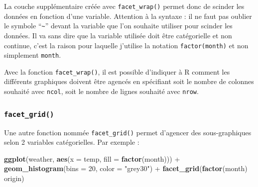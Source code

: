 \documentclass[
  a4paper,
]{article}
\newenvironment{Shaded}{\begin{snugshade}}{\end{snugshade}}
\newcommand{\DataTypeTok}[1]{\textcolor[rgb]{0.00,0.34,0.68}{#1}}
\newcommand{\DecValTok}[1]{\textcolor[rgb]{0.69,0.50,0.00}{#1}}
\newcommand{\KeywordTok}[1]{\textcolor[rgb]{0.12,0.11,0.11}{\textbf{#1}}}
\newcommand{\NormalTok}[1]{\textcolor[rgb]{0.12,0.11,0.11}{#1}}
\newcommand{\OperatorTok}[1]{\textcolor[rgb]{0.12,0.11,0.11}{#1}}
\newcommand{\StringTok}[1]{\textcolor[rgb]{0.75,0.01,0.01}{#1}}
\begin{document}
La couche supplémentaire créée avec \texttt{facet\_wrap()} permet donc de scinder les données en fonction d'une variable. Attention à la syntaxe : il ne faut pas oublier le symbole ``\texttt{\textasciitilde{}}'' devant la variable que l'on souhaite utiliser pour scinder les données. Il va sans dire que la variable utilisée doit être catégorielle et non continue, c'est la raison pour laquelle j'utilise la notation \texttt{factor(month)} et non simplement \texttt{month}.

Avec la fonction \texttt{facet\_wrap()}, il est possible d'indiquer à R comment les différents graphiques doivent être agencés en spécifiant soit le nombre de colonnes souhaité avec \texttt{ncol}, soit le nombre de lignes souhaité avec \texttt{nrow}.

\hypertarget{facet_grid}{%
\subsubsection{\texorpdfstring{\texttt{facet\_grid()}}{facet\_grid()}}\label{facet_grid}}

Une autre fonction nommée \texttt{facet\_grid()} permet d'agencer des sous-graphiques selon 2 variables catégorielles. Par exemple :

\begin{Shaded}
\begin{Highlighting}[]
\KeywordTok{ggplot}\NormalTok{(weather, }\KeywordTok{aes}\NormalTok{(}\DataTypeTok{x =}\NormalTok{ temp, }\DataTypeTok{fill =} \KeywordTok{factor}\NormalTok{(month))) }\OperatorTok{+}
\StringTok{  }\KeywordTok{geom_histogram}\NormalTok{(}\DataTypeTok{bins =} \DecValTok{20}\NormalTok{, }\DataTypeTok{color =} \StringTok{"grey30"}\NormalTok{) }\OperatorTok{+}
\StringTok{  }\KeywordTok{facet_grid}\NormalTok{(}\KeywordTok{factor}\NormalTok{(month) }\OperatorTok{~}\StringTok{ }\NormalTok{origin)}
\end{Highlighting}
\end{Shaded}
\end{document}
